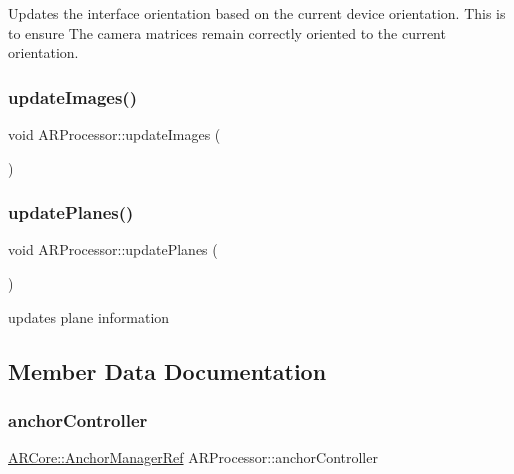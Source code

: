 Updates the interface orientation based on the current device orientation. This is to ensure The camera matrices remain correctly oriented to the current orientation. \mbox{\label{class_a_r_processor_a287729321790fb840cb27a49e65f68a8}} 
\subsubsection{\texorpdfstring{update\+Images()}{updateImages()}}
{\footnotesize\ttfamily void A\+R\+Processor\+::update\+Images (\begin{DoxyParamCaption}{ }\end{DoxyParamCaption})}

\mbox{\label{class_a_r_processor_aaa1488d9082ec598fd4aeb5c5c43d999}} 
\subsubsection{\texorpdfstring{update\+Planes()}{updatePlanes()}}
{\footnotesize\ttfamily void A\+R\+Processor\+::update\+Planes (\begin{DoxyParamCaption}{ }\end{DoxyParamCaption})}



updates plane information 



\subsection{Member Data Documentation}
\mbox{\label{class_a_r_processor_a8a1a8f16b30d2b0b4839a30d7ba4763d}} 
\subsubsection{\texorpdfstring{anchor\+Controller}{anchorController}}
{\footnotesize\ttfamily \mbox{\hyperlink{namespace_a_r_core_a3f2b9ba00b51ce19c1010f554a66a512}{A\+R\+Core\+::\+Anchor\+Manager\+Ref}} A\+R\+Processor\+::anchor\+Controller}




